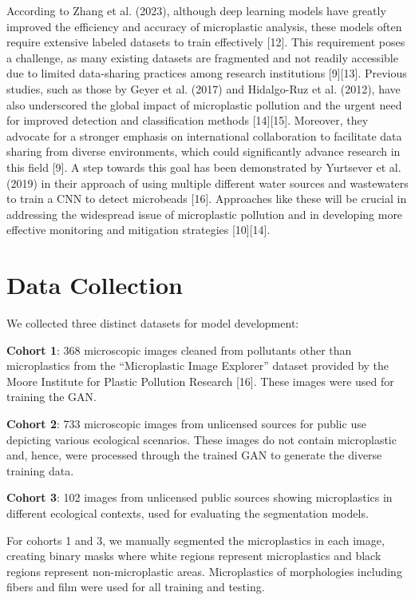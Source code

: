 \documentclass{article}
\begin{document}
According to Zhang et al. (2023), although deep learning models have greatly improved the efficiency and accuracy of microplastic analysis, these models often require extensive labeled datasets to train effectively [12]. This requirement poses a challenge, as many existing datasets are fragmented and not readily accessible due to limited data-sharing practices among research institutions [9][13]. Previous studies, such as those by Geyer et al. (2017) and Hidalgo-Ruz et al. (2012), have also underscored the global impact of microplastic pollution and the urgent need for improved detection and classification methods [14][15]. Moreover, they advocate for a stronger emphasis on international collaboration to facilitate data sharing from diverse environments, which could significantly advance research in this field [9]. A step towards this goal has been demonstrated by Yurtsever et al. (2019) in their approach of using multiple different water sources and wastewaters to train a CNN to detect microbeads [16]. Approaches like these will be crucial in addressing the widespread issue of microplastic pollution and in developing more effective monitoring and mitigation strategies [10][14].

\section{Data Collection}

We collected three distinct datasets for model development:

\textbf{Cohort 1}: 368 microscopic images cleaned from pollutants other than microplastics from the ``Microplastic Image Explorer'' dataset provided by the Moore Institute for Plastic Pollution Research [16]. These images were used for training the GAN.

\textbf{Cohort 2}: 733 microscopic images from unlicensed sources for public use depicting various ecological scenarios. These images do not contain microplastic and, hence, were processed through the trained GAN to generate the diverse training data.

\textbf{Cohort 3}: 102 images from unlicensed public sources showing microplastics in different ecological contexts, used for evaluating the segmentation models.

For cohorts 1 and 3, we manually segmented the microplastics in each image, creating binary masks where white regions represent microplastics and black regions represent non-microplastic areas. Microplastics of morphologies including fibers and film were used for all training and testing.
\end{document}
